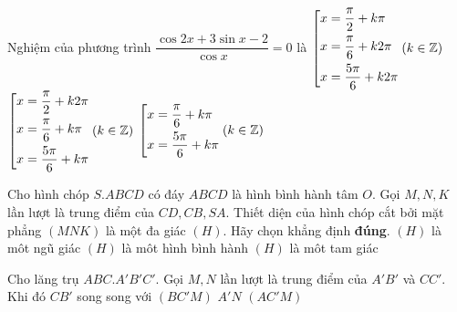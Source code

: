 	\begin{ex} %
	Nghiệm của phương trình $\dfrac{\cos 2x + 3\sin x - 2}{\cos x} = 0$ là
			{$\left[\begin{aligned}&x = \dfrac{\pi}{2} + k\pi \\&x = \dfrac{\pi}{6} + k2\pi\\&x = \dfrac{5\pi}{6} + k2\pi \end{aligned}\right. (k \in \mathbb{Z})$} {$\left[\begin{aligned}&x = \dfrac{\pi}{2} + k2\pi \\ &x = \dfrac{\pi}{6} + k \pi \\&x = \dfrac{5\pi}{6} + k\pi \end{aligned}\right. (k \in \mathbb{Z})$} {$\left[\begin{aligned}&x = \dfrac{\pi}{6} + k\pi \\&x = \dfrac{5\pi}{6} + k\pi \end{aligned}\right. (k \in \mathbb{Z})$}
	
	\end{ex}
					
	\begin{ex} %
	Cho hình chóp $S.ABCD$ có đáy $ABCD$ là hình bình hành tâm $O$. Gọi $M,N,K$ lần lượt là trung điểm của $CD, CB, SA$. Thiết diện của hình chóp cắt bởi mặt phẳng $(MNK)$ là một đa giác $(H)$. Hãy chọn khẳng định \textbf{đúng}.
		 {\True $(H)$ là môt ngũ giác} {$(H)$ là môt hình bình hành} {$(H)$ là môt tam giác}
	
	\end{ex}
					
	\begin{ex} %
	Cho lăng trụ $ABC.A'B'C'$. Gọi $M,N$ lần lượt là trung điểm của $A'B'$ và $CC'$. Khi đó $CB'$ song song với
		 {$(BC'M)$} {$A'N$} {\True $(AC'M)$}
	
	\end{ex}
					

